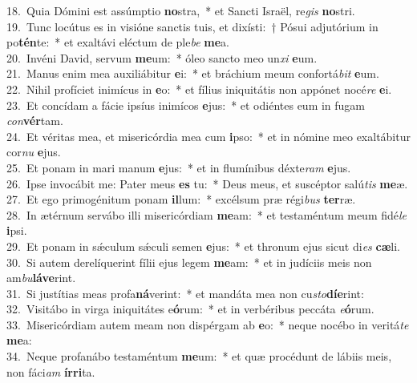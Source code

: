 {18.~}Quia Dómini est assúmptio \textbf{no}stra,~* et Sancti Israël, re\textit{gis} \textbf{no}stri.\\
{19.~}Tunc locútus es in visióne sanctis tuis, et dixísti:~† Pósui adjutórium in po\textbf{tén}te:~* et exaltávi eléctum de ple\textit{be} \textbf{me}a.\\
{20.~}Invéni David, servum \textbf{me}um:~* óleo sancto meo un\textit{xi} \textbf{e}um.\\
{21.~}Manus enim mea auxiliábitur \textbf{e}i:~* et bráchium meum confortá\textit{bit} \textbf{e}um.\\
{22.~}Nihil profíciet inimícus in \textbf{e}o:~* et fílius iniquitátis non appónet nocé\textit{re} \textbf{e}i.\\
{23.~}Et concídam a fácie ipsíus inimícos \textbf{e}jus:~* et odiéntes eum in fugam \textit{con}\textbf{vér}tam.\\
{24.~}Et véritas mea, et misericórdia mea cum \textbf{i}pso:~* et in nómine meo exaltábitur cor\textit{nu} \textbf{e}jus.\\
{25.~}Et ponam in mari manum \textbf{e}jus:~* et in flumínibus déxte\textit{ram} \textbf{e}jus.\\
{26.~}Ipse invocábit me: Pater meus \textbf{es} tu:~* Deus meus, et suscéptor salú\textit{tis} \textbf{me}æ.\\
{27.~}Et ego primogénitum ponam \textbf{il}lum:~* excélsum præ régi\textit{bus} \textbf{ter}ræ.\\
{28.~}In ætérnum servábo illi misericórdiam \textbf{me}am:~* et testaméntum meum fidé\textit{le} \textbf{i}psi.\\
{29.~}Et ponam in sǽculum sǽculi semen \textbf{e}jus:~* et thronum ejus sicut di\textit{es} \textbf{cæ}li.\\
{30.~}Si autem derelíquerint fílii ejus legem \textbf{me}am:~* et in judíciis meis non am\textit{bu}\textbf{lá}\textbf{ve}rint.\\
{31.~}Si justítias meas profa\textbf{ná}verint:~* et mandáta mea non cu\textit{sto}\textbf{dí}\textbf{e}rint:\\
{32.~}Visitábo in virga iniquitátes e\textbf{ó}rum:~* et in verbéribus peccáta \textit{e}\textbf{ó}rum.\\
{33.~}Misericórdiam autem meam non dispérgam ab \textbf{e}o:~* neque nocébo in veritá\textit{te} \textbf{me}a:\\
{34.~}Neque profanábo testaméntum \textbf{me}um:~* et quæ procédunt de lábiis meis, non fáci\textit{am} \textbf{ír}\textbf{ri}ta.\\
